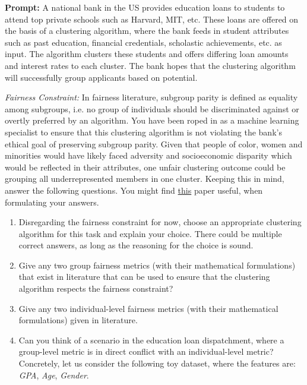 \documentclass[submit]{harvardml}
\begin{document}
\begin{problem}
\textbf{Prompt:} A national bank in the US provides education loans to students to attend top private schools such as Harvard, MIT, etc. These loans are offered on the basis of a clustering algorithm, where the bank feeds in student attributes such as past education, financial credentials, scholastic achievements, etc. as input. The algorithm clusters these students and offers differing loan amounts and interest rates to each cluster. The bank hopes that the clustering algorithm will successfully group applicants based on potential. 

\emph{Fairness Constraint:} 
In fairness literature, subgroup parity is defined as equality among subgroups, i.e. no group of individuals should be discriminated against or overtly preferred by an algorithm. You have been roped in as a machine learning specialist to ensure that this clustering algorithm is not violating the bank’s ethical goal of preserving subgroup parity. Given that people of color, women and minorities would have likely faced adversity and socioeconomic disparity which would be reflected in their attributes, one unfair clustering outcome could be grouping all underrepresented members in one cluster. Keeping this in mind, answer the following questions. You might find \href{https://ieeexplore.ieee.org/stamp/stamp.jsp?arnumber=9541160}{this} paper useful, when formulating your answers.

\begin{enumerate}
    \item Disregarding the fairness constraint for now, choose an appropriate clustering algorithm for this task and explain your choice. There could be multiple correct answers, as long as the reasoning for the choice is sound.
    \item Give any two group fairness metrics (with their mathematical formulations) that exist in literature that can be used to ensure that the clustering algorithm respects the fairness constraint? 
    \item Give any two individual-level fairness metrics (with their mathematical formulations) given in literature.
    \item Can you think of a scenario in the education loan dispatchment, where a group-level metric is in direct conflict with an individual-level metric? Concretely, let us consider the following toy dataset, where the features are: \textit{GPA}, \textit{Age}, \textit{Gender}.


\end{enumerate}
\end{problem}
\end{document}
